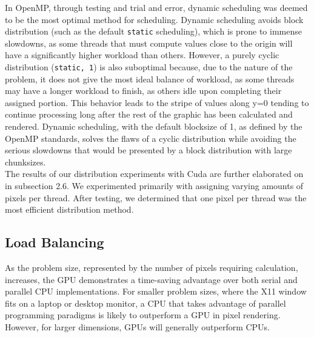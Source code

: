 \documentclass{article}
\begin{document}
In OpenMP, through testing and trial and error, dynamic scheduling was 
deemed to be the most optimal method for scheduling. Dynamic scheduling 
avoids block distribution (such as the default \verb|static| scheduling),
which is prone to immense slowdowns, as some threads that must compute 
values close to the origin will have a significantly higher workload than
others.
However, a purely cyclic distribution (\verb|static, 1|) is also suboptimal
because, due to the nature of the problem, it does not give the most ideal
balance of workload, as some threads may have a longer workload to finish, 
as others idle upon completing their assigned portion. This behavior leads
to the stripe of values along y=0 tending to continue processing long after
the rest of the graphic has been calculated and rendered.
Dynamic scheduling, with the default blocksize of 1, as defined by the 
OpenMP standards, solves the flaws of a cyclic distribution while avoiding 
the serious slowdowns that would be presented by a block distribution with 
large chunksizes.\\


The results of our distribution experiments with Cuda are further 
elaborated on in subsection 2.6. We experimented primarily with assigning 
varying amounts of pixels per thread. After testing, we determined that one
pixel per thread was the most efficient distribution method. 

\subsection{Load Balancing}

As the problem size, represented by the number of pixels requiring 
calculation, increases, the GPU demonstrates a time-saving advantage over 
both serial and parallel CPU implementations.
For smaller problem sizes, where the X11 window fits on a laptop or desktop
monitor, a CPU that takes advantage of parallel programming paradigms is 
likely to outperform a GPU in pixel rendering.
However, for larger dimensions, GPUs will generally outperform CPUs.\\
\end{document}
